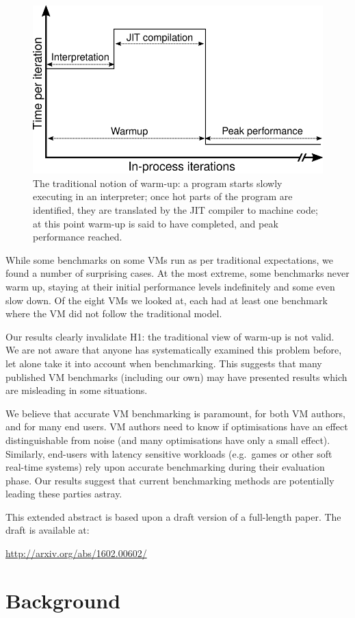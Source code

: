 \documentclass[preprint]{sigplanconf}
\newcommand{\hypone}{H1\xspace}
\begin{document}
\begin{figure}[t]
\centering
\includegraphics[width=.5\textwidth]{img/picturebook_warmup}
\caption{The traditional notion of warm-up: a program starts slowly executing in
an interpreter; once hot parts of the program are identified, they are
translated by the JIT compiler to machine code; at this point warm-up
is said to have completed, and peak performance reached.}
\label{fig:trad}
\end{figure}

While some benchmarks on some VMs run as per
traditional expectations, we found a number of surprising cases. At
the most extreme, some benchmarks never warm up, staying at their initial performance
levels indefinitely and some even slow down. Of the eight
VMs we looked at, each had at least one benchmark where the VM did
not follow the traditional model.

Our results clearly invalidate \hypone: the traditional view of warm-up is not
valid. We are not aware that anyone has systematically examined this
problem before, let alone take it into account when benchmarking. This suggests
that many published VM benchmarks (including our own) may have presented
results which are misleading in some situations.

We believe that accurate VM benchmarking is paramount, for both VM authors, and
for many end users. VM authors need to know if optimisations have an effect
distinguishable from noise (and many optimisations have only a small effect).
Similarly, end-users with latency sensitive workloads (e.g.~games or other soft
real-time systems) rely upon accurate benchmarking during their evaluation
phase. Our results suggest that current benchmarking methods are potentially leading
these parties astray.

This extended abstract is based upon a draft version of a full-length paper.
The draft is available at:
\begin{center}
\url{http://arxiv.org/abs/1602.00602/}
\end{center}

\section{Background}
\label{sec:warmup}
\end{document}
